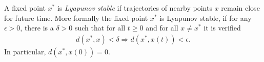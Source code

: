 \documentclass[12pt]{article}
\begin{document}
A fixed point $x^*$ is {\em Lyapunov stable} if trajectories of nearby points $x$ remain close for future time. More formally the fixed point $x^*$ is Lyapunov stable, if for any $\epsilon>0$, there is a $\delta>0$ such that  for all $t\ge 0$ and for all $x \neq x^*$ it is verified
\begin{align*} 
d(x^*,x)<\delta \Rightarrow d(x^*,x(t))<\epsilon.
\end{align*}
In particular, $d(x^*,x(0))=0$.
\end{document}
